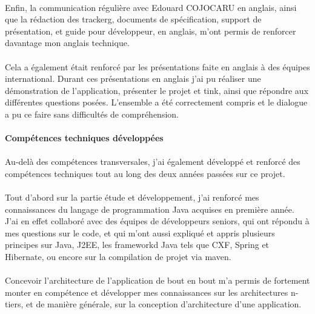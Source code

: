 \documentclass[12pt,a4paper]{report}
\begin{document}
\paragraph*{}Enfin, la communication régulière avec Edouard COJOCARU en anglais,
ainsi que la rédaction des \gls{trackerg}, documents de spécification, support de présentation, et guide pour développeur, en anglais, m’ont permis de renforcer davantage mon anglais technique. 
\paragraph*{}Cela a également était renforcé par les présentations faite en anglais à des équipes international. Durant ces présentations en anglais j'ai pu réaliser une démonstration de l'application, présenter le projet et \gls{tink}, ainsi que répondre aux différentes questions posées. L'ensemble a été correctement compris et le dialogue a pu ce faire sans difficultés de compréhension.
\paragraph{Compétences techniques développées}
\paragraph*{}Au-delà des compétences transversales, j’ai également développé et
renforcé des compétences techniques tout au long des deux années passées sur ce projet.
\paragraph*{}Tout d’abord sur la partie étude et développement, j’ai renforcé mes connaissances du langage de programmation Java acquises en première année. J’ai en effet collaboré avec des équipes de développeurs seniors, qui ont répondu à mes questions sur le code, et qui m’ont aussi expliqué et appris plusieurs principes sur Java, J2EE, les frameworkd Java tels que CXF, Spring et Hibernate, ou encore sur la compilation de projet via maven.
\paragraph*{}Concevoir l’architecture de l’application de bout en bout m’a permis de
fortement monter en compétence et développer mes connaissances sur les architectures n-tiers, et de manière générale, sur la conception d’architecture d’une application.
\end{document}

